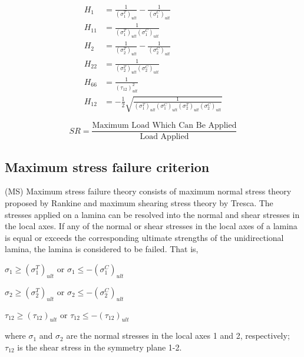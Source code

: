 \begin{equation}
	\begin{split}
		H_{1}&=\frac{1}{\left(\sigma_{1}^{T}\right)_{u l t}}-\frac{1}{\left(\sigma_{1}^{C}\right)_{u l t}} \\
		H_{11}&=\frac{1}{\left(\sigma_{1}^{T}\right)_{u l t}\left(\sigma_{1}^{C}\right)_{u l t}} \\
		H_{2}&=\frac{1}{\left(\sigma_{2}^{T}\right)_{u l t}}-\frac{1}{\left(\sigma_{2}^{C}\right)_{u l t}} \\
		H_{22}&=\frac{1}{\left(\sigma_{2}^{T}\right)_{u l t}\left(\sigma_{2}^{C}\right)_{u l t}} \\
		H_{66}&=\frac{1}{\left(\tau_{12}\right)_{u l t}^{2}} \\
		H_{12}&=-\frac{1}{2} \sqrt{\frac{1}{\left(\sigma_{1}^{T}\right)_{u l
		t}\left(\sigma_{1}^{C}\right)_{u l t}\left(\sigma_{2}^{T}\right)_{u l
		t}\left(\sigma_{2}^{C}\right)_{u l t}}}
	\end{split}
\end{equation}

\begin{equation} \label{eq:sr}S R=\frac{\text {Maximum Load Which Can Be Applied}}{\text {Load Applied}}
\end{equation}

\subsection{Maximum stress failure criterion}(MS)
Maximum stress failure theory consists of maximum normal stress theory proposed by Rankine and maximum 
shearing stress theory by Tresca. The stresses applied on a lamina can be resolved into the normal and shear stresses 
in the local axes. If any of the normal or shear stresses in the local axes of a lamina is equal or exceeds the corresponding 
ultimate strengths of the unidirectional lamina, the lamina is considered to be failed. That is,


$\sigma_1 \geq (\sigma _1^{T})_{ult} $ or $\sigma_1 \leq -(\sigma _1^{C})_{ult} $

$\sigma_2 \geq (\sigma _2^{T})_{ult} $ or $\sigma_2 \leq -(\sigma _2^{C})_{ult} $

$\tau_{12} \geq (\tau_{12})_{ult} $  or $\tau_{12} \leq -(\tau_{12})_{ult} $

where $\sigma_1$ and $\sigma_2$ are the normal stresses in the local axes 1 and 2, respectively;
$\tau_{12}$ is the shear stress in the symmetry plane 1-2.


